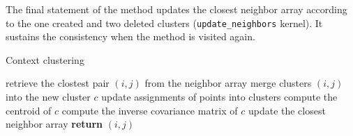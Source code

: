 \begin{description}
	The final statement of the method updates the closest neighbor array according to the one created and two deleted clusters (\texttt{update\_neighbors} kernel). It sustains the consistency when the method is visited again.  
	
	\begin{algorithm}
	\caption{Context clustering}
	\label{alg03:context}
	\begin{algorithmic}[1]
		\State retrieve the clostest pair $(i,j)$ from the neighbor array
		\State merge clusters $(i,j)$ into the new cluster $c$
		\State update assignments of points into clusters
		\State compute the centroid of $c$
		\State compute the inverse covariance matrix of $c$
		\EndIf
		\State update the closest neighbor array
		\State \textbf{return} $(i,j)$
		\EndProcedure
	\end{algorithmic}
\end{algorithm}

\end{description}





 
